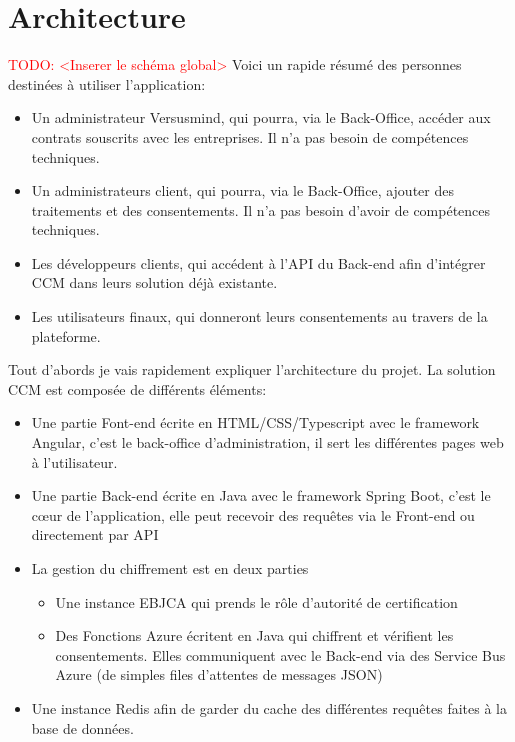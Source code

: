 \documentclass[12pt, a4paper]{report}
\makeatletter
\newcommand\TODO[1]{\textcolor{red}{TODO\@: #1}}
\makeatother
\begin{document}
        \section{Architecture}
            \TODO{<Inserer le schéma global>} \newline
            Voici un rapide résumé des personnes destinées à utiliser l'application:
            \begin{itemize}
                \item Un administrateur Versusmind, qui pourra, via le Back-Office, accéder aux contrats souscrits avec les entreprises. Il n'a pas besoin de compétences techniques.
                \item Un administrateurs client, qui pourra, via le Back-Office, ajouter des traitements et des consentements. Il n'a pas besoin d'avoir de compétences techniques.
                \item Les développeurs clients, qui accédent à l'API du Back-end afin d'intégrer CCM dans leurs solution déjà existante.
                \item Les utilisateurs finaux, qui donneront leurs consentements au travers de la plateforme.
            \end{itemize}
            Tout d'abords je vais rapidement expliquer l'architecture du projet.
            La solution CCM est composée de différents éléments:
            \begin{itemize}
                \item Une partie Font-end écrite en HTML/CSS/Typescript avec le framework Angular, c'est le back-office d'administration, il sert les différentes pages web à l'utilisateur.
                \item Une partie Back-end écrite en Java avec le framework Spring Boot, c'est le cœur de l'application, elle peut recevoir des requêtes via le Front-end ou directement par API
                \item La gestion du chiffrement est en deux parties
                    \begin{itemize}
                        \item Une instance EBJCA qui prends le rôle d'autorité de certification
                        \item Des Fonctions Azure écritent en Java qui chiffrent et vérifient les consentements. Elles communiquent avec le Back-end via des Service Bus Azure (de simples files d'attentes de messages JSON)
                    \end{itemize}
                \item Une instance Redis afin de garder du cache des différentes requêtes faites à la base de données.
            \end{itemize}
\end{document}
